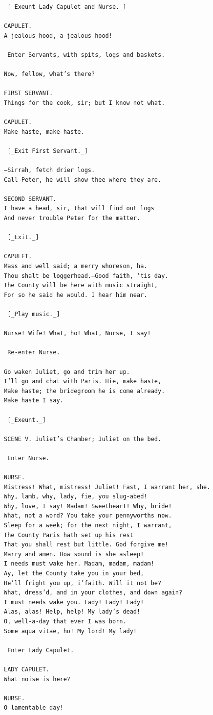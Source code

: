 \documentclass{article}
\begin{document}
\begin{verbatim}
 [_Exeunt Lady Capulet and Nurse._]

CAPULET.
A jealous-hood, a jealous-hood!

 Enter Servants, with spits, logs and baskets.

Now, fellow, what’s there?

FIRST SERVANT.
Things for the cook, sir; but I know not what.

CAPULET.
Make haste, make haste.

 [_Exit First Servant._]

—Sirrah, fetch drier logs.
Call Peter, he will show thee where they are.

SECOND SERVANT.
I have a head, sir, that will find out logs
And never trouble Peter for the matter.

 [_Exit._]

CAPULET.
Mass and well said; a merry whoreson, ha.
Thou shalt be loggerhead.—Good faith, ’tis day.
The County will be here with music straight,
For so he said he would. I hear him near.

 [_Play music._]

Nurse! Wife! What, ho! What, Nurse, I say!

 Re-enter Nurse.

Go waken Juliet, go and trim her up.
I’ll go and chat with Paris. Hie, make haste,
Make haste; the bridegroom he is come already.
Make haste I say.

 [_Exeunt._]

SCENE V. Juliet’s Chamber; Juliet on the bed.

 Enter Nurse.

NURSE.
Mistress! What, mistress! Juliet! Fast, I warrant her, she.
Why, lamb, why, lady, fie, you slug-abed!
Why, love, I say! Madam! Sweetheart! Why, bride!
What, not a word? You take your pennyworths now.
Sleep for a week; for the next night, I warrant,
The County Paris hath set up his rest
That you shall rest but little. God forgive me!
Marry and amen. How sound is she asleep!
I needs must wake her. Madam, madam, madam!
Ay, let the County take you in your bed,
He’ll fright you up, i’faith. Will it not be?
What, dress’d, and in your clothes, and down again?
I must needs wake you. Lady! Lady! Lady!
Alas, alas! Help, help! My lady’s dead!
O, well-a-day that ever I was born.
Some aqua vitae, ho! My lord! My lady!

 Enter Lady Capulet.

LADY CAPULET.
What noise is here?

NURSE.
O lamentable day!


\end{verbatim}
\end{document}

